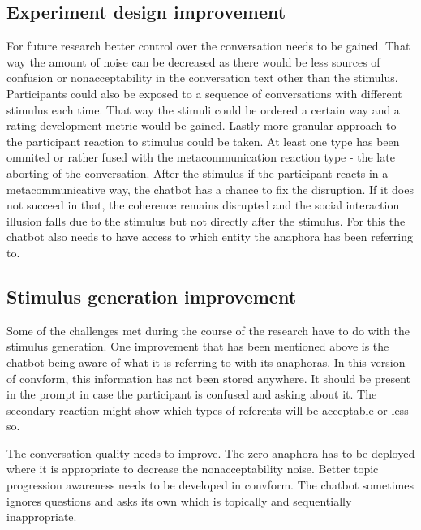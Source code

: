 \documentclass[12pt]{report}
\begin{document}
{    \subsection{Experiment design improvement}

        For future research better control over the conversation needs to be gained.
        That way the amount of noise can be decreased as there would be less sources
        of confusion or nonacceptability in the conversation text other than the stimulus.
        Participants could also be exposed to a sequence of conversations with different stimulus each time.
        That way the stimuli could be ordered a certain way and a rating development metric would be gained.
        Lastly more granular approach to the participant reaction to stimulus could be taken.
        At least one type has been ommited or rather fused with the metacommunication reaction type -
        the late aborting of the conversation.
        After the stimulus if the participant reacts in a metacommunicative way,
        the chatbot has a chance to fix the disruption.
        If it does not succeed in that, the coherence remains disrupted and
        the social interaction illusion falls due to the stimulus but not directly after the stimulus.
        For this the chatbot also needs to have access to which entity the anaphora has been referring to.

    \subsection{Stimulus generation improvement}

        Some of the challenges met during the course of the research have to do with
        the stimulus generation.
        One improvement that has been mentioned above is the chatbot being aware of what it is referring to
        with its anaphoras.
        In this version of convform, this information has not been stored anywhere.
        It should be present in the prompt in case the participant is confused and asking about it.
        The secondary reaction might show which types of referents will be acceptable or less so.

        The conversation quality needs to improve.
        The zero anaphora has to be deployed where it is appropriate to decrease the nonacceptability noise.
        Better topic progression awareness needs to be developed in convform.
        The chatbot sometimes ignores questions and asks its own which is topically and sequentially inappropriate.

}
\end{document}
